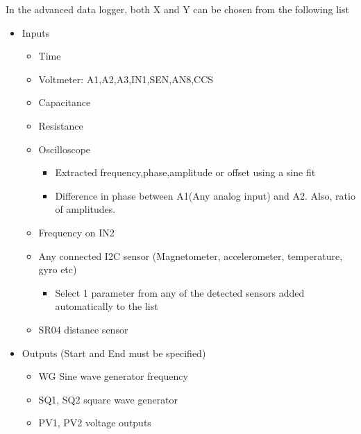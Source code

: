 \documentclass[a4paper,12pt,english]{sphinxmanual}
\begin{document}
In the advanced data logger, both X and Y can be chosen from the following list
\begin{itemize}
\item {} 
Inputs
\begin{itemize}
\item {} 
Time

\item {} 
Voltmeter: A1,A2,A3,IN1,SEN,AN8,CCS

\item {} 
Capacitance

\item {} 
Resistance

\item {} 
Oscilloscope
\begin{itemize}
\item {} 
Extracted frequency,phase,amplitude or offset using a sine fit

\item {} 
Difference in phase between A1(Any analog input) and A2. Also, ratio of amplitudes.

\end{itemize}

\item {} 
Frequency on IN2

\item {} 
Any connected I2C sensor (Magnetometer, accelerometer, temperature, gyro etc)
\begin{itemize}
\item {} 
Select 1 parameter from any of the detected sensors added automatically to the list

\end{itemize}

\item {} 
SR04 distance sensor

\end{itemize}

\item {} 
Outputs (Start and End must be specified)
\begin{itemize}
\item {} 
WG Sine wave generator frequency

\item {} 
SQ1, SQ2 square wave generator

\item {} 
PV1, PV2 voltage outputs

\end{itemize}

\end{itemize}
\end{document}
